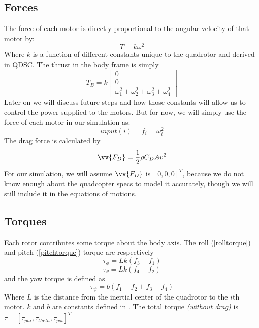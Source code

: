 \documentclass[12pt]{article}
\begin{document}
\subsection{Forces}
The force of each motor is directly proportional to the angular velocity of that motor by:
\begin{equation}
T = k\omega^2
\end{equation}
Where  $k$ is a function of different constants unique to the quadrotor and derived in QDSC\cite{QDSC}.
\newline
The thrust in the body frame is simply
\begin{equation}
T_{B} = k \begin{bmatrix}
0 \\ 0 \\ \omega_{1}^2+\omega_{2}^2+\omega_{3}^2+\omega_{4}^2 \end{bmatrix}
\end{equation}
Later on we will discuss future steps and how those constants will allow us to control the power supplied to the motors. But for now, we will simply use the force of each motor in our simulation as: 
\begin{equation*}
input(\textit{i}) = f_{i} = \omega_{i}^2
\end{equation*}
\newline
The drag force is calculated by 
\begin{equation*}
\vv{F_{D}} = \frac{1}{2} \rho C_{D} A v^2
\end{equation*}
For our simulation, we will assume $\vv{F_{D}}$ is $[0,0,0]^T$, because we do not know enough about the quadcopter specs to model it accurately, though we will still include it in the equations of motions.

\subsection{Torques}
Each rotor contributes some torque about the body axis. The roll (\ref{rolltorque}) and pitch (\ref{pitchtorque}) torque are respectively
\begin{equation}\label{rolltorque}
\tau_{\phi} = Lk(f_{3}-f_{1})
\end{equation}
\begin{equation} \label{pitchtorque}
\tau_{\theta} = Lk(f_{4}-f_{2})
\end{equation}
and the yaw torque is defined as 
\begin{equation}
\tau_{\psi} = b(f_{1}-f_{2}+f_{3}-f_{4})
\end{equation}
Where $L$ is the distance from the inertial center of the quadrotor to the $i$th motor. $k$ and $b$ are constants defined in \cite{QDSC}. The total torque \textit{(without drag)} is $\tau=[\tau_{phi},\tau_{theta},\tau_{psi}]^T$
\end{document}
